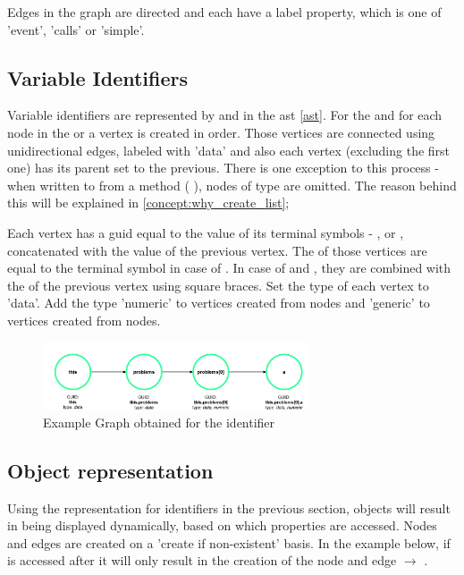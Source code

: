 Edges in the graph are directed and each have a label property, which is one of 'event', 'calls' or 'simple'. 

\subsection{Variable Identifiers}
\label{concept:variable_identifiers}
Variable identifiers are represented by  and  in the \gls{ast} \ref{ast}. For the  and for each  node in the  or  a vertex is created in order. 
Those vertices are connected using unidirectional edges, labeled with 'data' and also each vertex (excluding the first one) has its parent set to the previous. There is one exception to this process - when written to from a method ( ), nodes of type  are omitted. The reason behind this will be explained in \ref{concept:why_create_list};

Each vertex has a \gls{guid} equal to the value of its terminal symbols - ,  or , concatenated with the value of the previous vertex.
The  of those vertices are equal to the terminal symbol in case of . In case of  and , they are combined with the  of the previous vertex using square braces. Set the type of each vertex to 'data'. Add the type 'numeric' to vertices created from  nodes and 'generic' to vertices created from  nodes. 

\begin{figure}[H]
    \centering
    \includegraphics[width=0.7\textwidth]{images/graph_simple.png}
     \caption{Example Graph obtained for the identifier  }
     \label{fig:graph_simple}
\end{figure}

\subsection{Object representation}
Using the representation for identifiers in the previous section, objects will result in being displayed dynamically, based on which properties are accessed. Nodes and edges are created on a 'create if non-existent' basis. In the example below, if  is accessed after  it will only result in the creation of the node  and edge  $\rightarrow$  .

